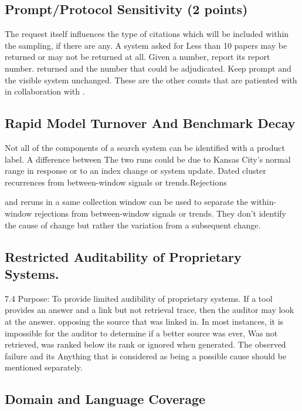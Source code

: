\documentclass[acmsmall,screen,nonacm]{acmart}
\begin{document}
\subsection{Prompt/Protocol Sensitivity (2 points)}

The request itself influences the type of citations which will be included within the sampling, if there are any. A system asked for Less than 10 papers may be returned or may not be returned at all. Given a number, report its report number. returned and the number that could be adjudicated. Keep prompt and the visible system unchanged. These are the other counts that are patiented with in collaboration with \cite{ref12,ref18}.

\subsection{Rapid Model Turnover And Benchmark Decay}

Not all of the components of a search system can be identified with a product label. A difference between The two runs could be due to Kansas City’s normal range in response or to an index change or system update. Dated cluster recurrences from between-window signals or trends.Rejections

and reruns in a same collection window can be used to separate the within-window rejections from between-window signals or trends. They don’t identify the cause of change but rather the variation from a subsequent change.

\subsection{Restricted Auditability of Proprietary Systems.}

7.4 Purpose: To provide limited audibility of proprietary systems. If a tool provides an answer and a link but not retrieval trace, then the auditor may look at the answer. opposing the source that was linked in. In most instances, it is impossible for the auditor to determine if a better source was ever, Was not retrieved, was ranked below its rank or ignored when generated. The observed failure and its Anything that is considered as being a possible cause should be mentioned separately.

\subsection{Domain and Language Coverage}
\end{document}
